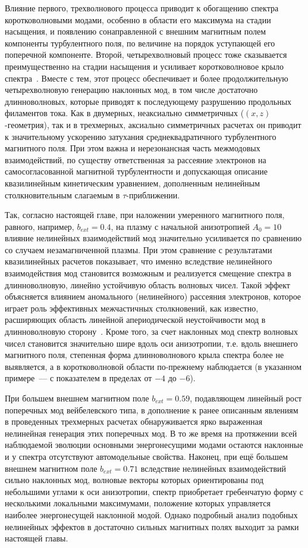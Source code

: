 Влияние первого, трехволнового процесса приводит к обогащению спектра коротковолновыми модами, особенно в области его максимума на стадии насыщения, и появлению сонаправленной с внешним магнитным полем компоненты турбулентного поля, по величине на порядок уступающей его поперечной компоненте. Второй, четырехволновый процесс тоже сказывается преимущественно на стадии насыщения и усиливает коротковолновое крыло спектра~\cite{Kuznetsov2023}. Вместе с тем, этот процесс обеспечивает и более продолжительную четырехволновую генерацию наклонных мод, в том числе достаточно длинноволновых, которые приводят к последующему разрушению продольных филаментов тока. Как в двумерных, неаксиально симметричных ($(x,z)$-геометрия), так и в трехмерных, аксиально симметричных расчетах он приводит к значительному ускорению затухания среднеквадратичного турбулентного магнитного поля. При этом важна и нерезонансная часть межмодовых взаимодействий, по существу ответственная за рассеяние электронов на самосогласованной магнитной турбулентности и допускающая описание квазилинейным кинетическим уравнением, дополненным нелинейным столкновительным слагаемым в $\tau$-приближении.

Так, согласно настоящей главе, при наложении умеренного магнитного поля, равного, например, $b_{ext}=0.4$, на плазму с начальной анизотропией $A_0=10$ влияние нелинейных взаимодействий мод значительно усиливается по сравнению со случаем незамагниченной плазмы. При этом сравнение с результатами квазилинейных расчетов показывает, что именно вследствие нелинейного взаимодействия мод становится возможным и реализуется смещение спектра в длинноволновую, линейно устойчивую область волновых чисел. Такой эффект объясняется влиянием аномального (нелинейного) рассеяния электронов, которое играет роль эффективных межчастичных столкновений, как известно, расширяющих область линейной апериодической неустойчивости мод в длинноволновую сторону~\cite{Emelyanov2023_Radiophys}. Кроме того, за счет наклонных мод спектр волновых чисел становится значительно шире вдоль оси анизотропии, т.е. вдоль внешнего магнитного поля, степенная форма длинноволнового крыла спектра более не выявляется, а в коротковолновой области по-прежнему наблюдается (в указанном примере~--- с показателем в пределах от $-4$ до $-6$).

При большем внешнем магнитном поле $b_{ext}=0.59$, подавляющем линейный рост поперечных мод вейбелевского типа, в дополнение к ранее описанным явлениям в проведенных трехмерных расчетах обнаруживается ярко выраженная нелинейная генерация этих поперечных мод.
В то же время на протяжении всей наблюдаемой эволюции основными энергонесущими модами остаются наклонные и у спектра отсутствуют автомодельные свойства. Наконец, при ещё большем внешнем магнитном поле $b_{ext}=0.71$ вследствие нелинейных взаимодействий сильно наклонных мод, волновые векторы которых ориентированы под небольшими углами к оси анизотропии, спектр приобретает гребенчатую форму с несколькими локальными максимумами, положение которых управляется наиболее энергонесущей наклонной модой. Однако подробный анализ подобных нелинейных эффектов в достаточно сильных магнитных полях выходит за рамки настоящей главы.

